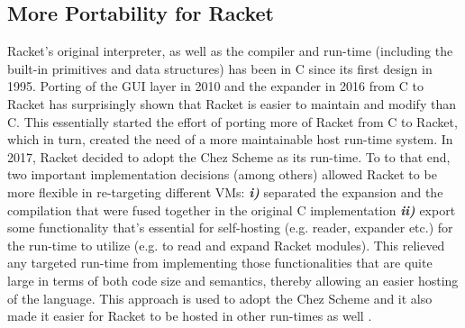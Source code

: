 \subsection[More Portability for Racket]{More Portability for Racket}
\label{subsec:racketcs}

Racket's original interpreter, as well as the compiler and run-time
(including the built-in primitives and data structures) has been in C
since its first design in 1995. Porting of the GUI layer in 2010 and
the expander in 2016 from C to Racket has surprisingly shown that
Racket is easier to maintain and modify than C. This essentially
started the effort of porting more of Racket from C to Racket, which
in turn, created the need of a more maintainable host run-time
system. In 2017, Racket decided to adopt the Chez Scheme as its
run-time. To to that end, two important implementation decisions
(among others) allowed Racket to be more flexible in re-targeting
different VMs: \textit{\textbf{i)}} separated the expansion and the
compilation that were fused together in the original C implementation
\textit{\textbf{ii)}} export some functionality that's essential for
self-hosting (e.g. reader, expander etc.) for the run-time to utilize
(e.g. to read and expand Racket modules). This relieved any targeted
run-time from implementing those functionalities that are quite large
in terms of both code size and semantics, thereby allowing an easier
hosting of the language. This approach is used to adopt the Chez
Scheme and it also made it easier for Racket to be hosted in other
run-times as well \cite{racket-on-chez-19}.
